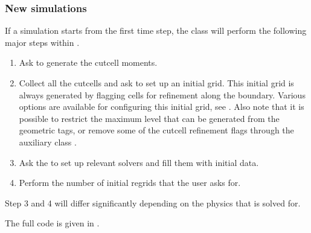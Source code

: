 \documentclass[letterpaper,10pt,english]{sphinxmanual}
\begin{document}
\subsubsection{New simulations}
\label{\detokenize{Source/Driver:new-simulations}}
If a simulation starts from the first time step, the  class will perform the following major steps within .
\begin{enumerate}
%
\item {} 
Ask  to generate the cut\sphinxhyphen{}cell moments.

\item {} 
Collect all the cut\sphinxhyphen{}cells and ask  to set up an initial grid.
This initial grid is always generated by flagging cells for refinement along the boundary.
Various options are available for configuring this initial grid, see {\hyperref[\detokenize{Source/SpatialDiscretization:chap-refinementphilosophy}]{}}.
Also note that it is possible to restrict the maximum level that can be generated from the geometric tags, or remove some of the cut\sphinxhyphen{}cell refinement flags through the auxiliary class .

\item {} 
Ask the  to set up relevant solvers and fill them with initial data.

\item {} 
Perform the number of initial regrids that the user asks for.

\end{enumerate}

Step 3 and 4 will differ significantly depending on the physics that is solved for.

The full code is given in .
\end{document}
